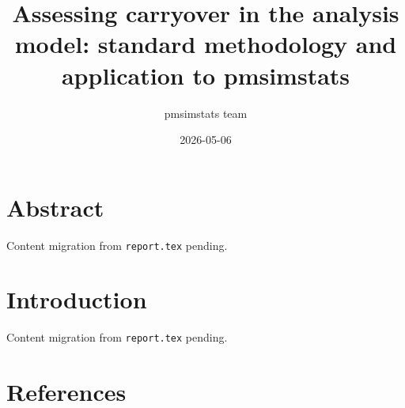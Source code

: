 \documentclass[
]{article}
\title{Assessing carryover in the analysis model: standard methodology and application to pmsimstats}
\author{pmsimstats team}
\date{2026-05-06}
\begin{document}
\maketitle

\section{Abstract}\label{abstract}

Content migration from \texttt{report.tex} pending.

\section{Introduction}\label{introduction}

Content migration from \texttt{report.tex} pending.

\section{References}\label{references}
\end{document}
